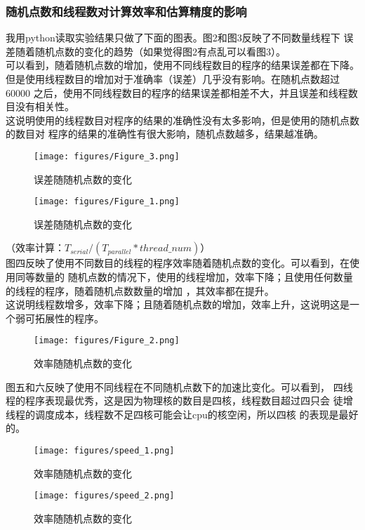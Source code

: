 \documentclass{SYSUReport}
\begin{document}
\subsubsection{随机点数和线程数对计算效率和估算精度的影响}
我用python读取实验结果只做了下面的图表。图2和图3反映了不同数量线程下
误差随着随机点数的变化的趋势（如果觉得图2有点乱可以看图3）。\\
可以看到，随着随机点数的增加，使用不同线程数目的程序的结果误差都在下降。
但是使用线程数目的增加对于准确率（误差）几乎没有影响。在随机点数超过60000
之后，使用不同线程数目的程序的结果误差都相差不大，并且误差和线程数目没有相关性。\\
这说明使用的线程数目对程序的结果的准确性没有太多影响，但是使用的随机点数的数目对
程序的结果的准确性有很大影响，随机点数越多，结果越准确。\\
\begin{figure}[htbp]
    \centering          %
    \texttt{[image: figures/Figure\_3.png]} %
    \caption{误差随随机点数的变化}  %
    \label{error1} %
\end{figure}
\begin{figure}[htbp]
    \centering          %
    \texttt{[image: figures/Figure\_1.png]} %
    \caption{误差随随机点数的变化}  %
    \label{error} %
\end{figure}
（效率计算：$T_{serial}/(T_{parallel}*thread\_num)$）\\
图四反映了使用不同数目的线程的程序效率随着随机点数的变化。可以看到，在使用同等数量的
随机点数的情况下，使用的线程增加，效率下降；且使用任何数量的线程的程序，随着随机点数数量的增加
，其效率都在提升。\\
这说明线程数增多，效率下降；且随着随机点数的增加，效率上升，这说明这是一个弱可拓展性的程序。\\
\begin{figure}[htbp]
    \centering          %
    \texttt{[image: figures/Figure\_2.png]} %
    \caption{效率随随机点数的变化}  %
    \label{efficiency} %
\end{figure}
图五和六反映了使用不同线程在不同随机点数下的加速比变化。可以看到，
四线程的程序表现最优秀，这是因为物理核的数目是四核，线程数目超过四只会
徒增线程的调度成本，线程数不足四核可能会让cpu的核空闲，所以四核
的表现是最好的。
\begin{figure}[htbp]
    \centering          %
    \texttt{[image: figures/speed\_1.png]} %
    \caption{效率随随机点数的变化}  %
    \label{speed1} %
\end{figure}
\begin{figure}[htbp]
    \centering          %
    \texttt{[image: figures/speed\_2.png]} %
    \caption{效率随随机点数的变化}  %
    \label{speed2} %
\end{figure}
\end{document}
